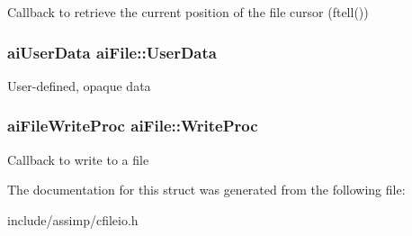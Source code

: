 \-Callback to retrieve the current position of the file cursor (ftell()) \hypertarget{structaiFile_aec528fa18f4755fe4f28d604fde28aad}{
\subsubsection[{\-User\-Data}]{\setlength{\rightskip}{0pt plus 5cm}ai\-User\-Data {\bf ai\-File\-::\-User\-Data}}}\label{structaiFile_aec528fa18f4755fe4f28d604fde28aad}
\-User-\/defined, opaque data \hypertarget{structaiFile_ab9fca3a62e34a33592c13a6f31db7d1d}{
\subsubsection[{\-Write\-Proc}]{\setlength{\rightskip}{0pt plus 5cm}ai\-File\-Write\-Proc {\bf ai\-File\-::\-Write\-Proc}}}\label{structaiFile_ab9fca3a62e34a33592c13a6f31db7d1d}
\-Callback to write to a file 

\-The documentation for this struct was generated from the following file\-:\begin{DoxyCompactItemize}
\item 
include/assimp/cfileio.\-h\end{DoxyCompactItemize}
